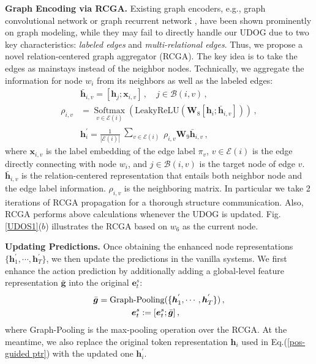 \documentclass[letterpaper]{article} \usepackage{aaai22}  \usepackage{times}  \usepackage{helvet}  \usepackage{courier}  \usepackage[hyphens]{url}  \usepackage{graphicx} \urlstyle{rm} \def\UrlFont{\rm}  \usepackage{natbib}  \usepackage{caption} \DeclareCaptionStyle{ruled}{labelfont=normalfont,labelsep=colon,strut=off} \frenchspacing  \setlength{\pdfpagewidth}{8.5in}  \setlength{\pdfpageheight}{11in}  \usepackage{algorithm}
\begin{document}
\noindent\textbf{Graph Encoding via RCGA.}
Existing graph encoders, e.g., graph convolutional network \cite{marcheggiani-titov-2017-encoding} or graph recurrent network \cite{zhang-zhang-2019-tree}, have been shown prominently on graph modeling, while they may fail to directly handle our UDOG due to two key characteristics: \emph{labeled edges} and \emph{multi-relational edges}.
Thus, we propose a novel relation-centered graph aggregator (RCGA).
The key idea is to take the edges as mainstays instead of the neighbor nodes.
Technically, we aggregate the information for node $w_i$ from its neighbors as well as the labeled edges:
\setlength\abovedisplayskip{2pt}
\setlength\belowdisplayskip{2pt}
\begin{align}
&\bar{\bm{h}}_{i,v} = [\bm{h}_j; \bm{x}_{i,v}] \,, \quad  j \in \mathcal{B}(i,v) \,, \\
\rho_{i,v} &= \mathop{\text{Softmax}}\limits_{v \in \mathcal{E}(i)}(\text{LeakyReLU}(\bm{W}_8[\bm{h}_i; \bar{\bm{h}}_{i,v}])) \,, \\
&\bm{h}^{'}_{i} = \frac{1}{| \mathcal{E}(i)|}\begin{matrix} \sum_{v \in \mathcal{E}(i)} \end{matrix}  \rho_{i,v} \bm{W}_{9}\bar{\bm{h}}_{i,v} \,, 
\end{align}
where $\bm{x}_{i,v}$ is the label embedding of the edge label $\pi_v$,
$v \in\mathcal{E}(i)$ is the edge directly connecting with node $w_i$, 
and $j \in\mathcal{B}(i,v)$ is the target node of edge $v$.
$\bar{\bm{h}}_{i,v}$ is the relation-centered representation that entails both neighbor node and the edge label information.
$\rho_{i,v}$ is the neighboring matrix.
In particular we take 2 iterations of RCGA propagation for a thorough structure communication.
Also, RCGA performs above calculations whenever the UDOG is updated.
Fig. \ref{UDOS1}($b$) illustrates the RCGA based on $w_6$ as the current node.









\noindent\textbf{Updating Predictions.}
Once obtaining the enhanced node representations $\{\bm{h}^{'}_{1},\cdots,\bm{h}^{'}_{T}\}$, we then update the predictions in the vanilla systems.
We first enhance the action prediction by additionally adding a global-level feature representation $\bar{\bm{g}}$ into the original $\bm{e}^s_t$:
\begin{equation}
\begin{aligned}
\setlength\abovedisplayskip{2pt}
\setlength\belowdisplayskip{2pt}
\bar{\bm{g}} = \text{Graph-Pooling}&(\{\bm{h}^{'}_1, \cdots, \bm{h}^{'}_T\}) \,, \\
\bm{e}_t^{s} := [\bm{e}_t^{s}&;\bar{\bm{g}}] \,,
\end{aligned}
\end{equation} 
where Graph-Pooling is the max-pooling operation over the RCGA.
At the meantime, we also replace the original token representation $\bm{h}_i$ used in Eq.(\ref{pos-guided ptr}) with the updated one $\bm{h}^{'}_i$.
\end{document}

